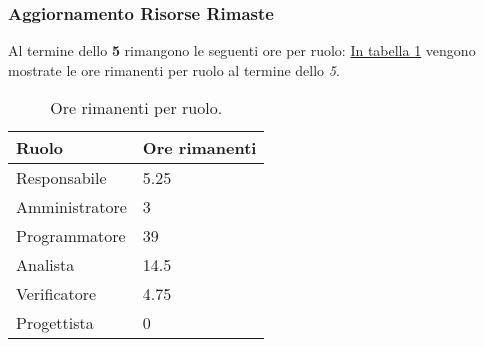 \subsubsection{Aggiornamento Risorse Rimaste}
\label{sec:AggiornamentoRisorse_Sprint5}
Al termine dello \textbf{ 5} rimangono le seguenti ore per ruolo: \hyperref[tab:sprint5_ore_rimanenti]{In tabella \ref{tab:sprint5_ore_rimanenti}} vengono mostrate le ore rimanenti per ruolo al termine dello \textit{ 5}.

\begin{table}[H]
    \centering
    \begin{tabular}{| l | l |}
    \hline
    \textbf{Ruolo} & 
    \textbf{Ore rimanenti}\\
    \hline
        Responsabile & 5.25\\
    \hline
        Amministratore & 3\\
    \hline
        Programmatore & 39\\
    \hline
        Analista & 14.5\\
    \hline
        Verificatore & 4.75\\
    \hline
        Progettista & 0\\
    \hline
    \end{tabular}
    \caption{Ore rimanenti per ruolo.}
    \label{tab:sprint5_ore_rimanenti} 
\end{table}